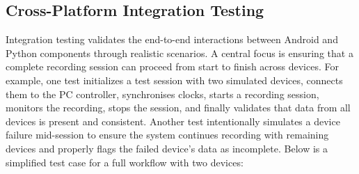 \documentclass[11pt,a4paper]{report}
\begin{document}
\subsection{Cross-Platform Integration Testing}
Integration testing validates the end-to-end interactions between Android and Python components through realistic scenarios. A central focus is ensuring that a complete recording session can proceed from start to finish across devices. For example, one test initializes a test session with two simulated devices, connects them to the PC controller, synchronises clocks, starts a recording session, monitors the recording, stops the session, and finally validates that data from all devices is present and consistent. Another test intentionally simulates a device failure mid-session to ensure the system continues recording with remaining devices and properly flags the failed device’s data as incomplete.
Below is a simplified test case for a full workflow with two devices:
\end{document}
